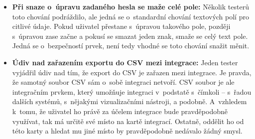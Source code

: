 \begin{itemize}
\item\textbf{Při snaze o~úpravu zadaného hesla se maže celé pole:} Několik testerů toto chování podráždilo, ale jedná se o~standardní chování textových polí pro citlivé údaje. Pokud uživatel přestane s~úpravou takového pole, později s~úpravou zase začne a pokusí se smazat jeden znak, smaže se celý text pole. Jedná se o~bezpečností prvek, není tedy vhodné se toto chování snažit měnit.
\item\textbf{Údiv nad zařazením exportu do CSV mezi integrace:} Jeden tester vyjádřil údiv nad tím, že export do CSV je zařazen mezi integrace. Je pravda, že samotný soubor CSV sám o~sobě integraci netvoří. CSV soubor je ale integračním prvkem, který umožňuje integraci v~podstatě s~čímkoli – s~řadou dalších systémů, s~nějakými vizualizačními nástroji, a podobně. A~vzhledem k~tomu, že uživatel ho právě za účelem integrace bude pravděpodobně využívat, tak má určitě své místo na kartě integrací. Ostatně, oddělit ho od této karty a hledat mu jiné místo by pravděpodobně nedávalo žádný smysl.
\end{itemize}































































